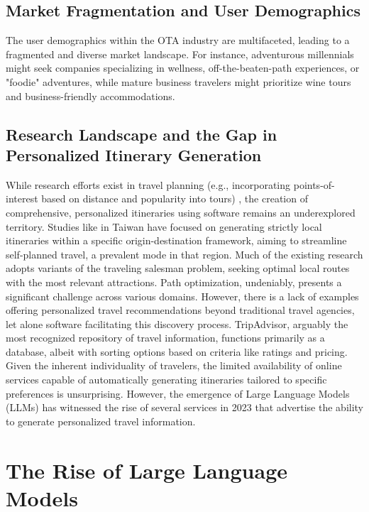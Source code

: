 \documentclass[12pt,a4paper]{report}
\begin{document}
\subsection{Market Fragmentation and User Demographics}

The user demographics within the OTA industry are multifaceted, leading to a fragmented and diverse market landscape. For instance, adventurous millennials might seek companies specializing in wellness, off-the-beaten-path experiences, or "foodie" adventures, while mature business travelers might prioritize wine tours and business-friendly accommodations.

\subsection{Research Landscape and the Gap in Personalized Itinerary Generation}

While research efforts exist in travel planning (e.g., incorporating points-of-interest based on distance and popularity into tours) \citep{taylortravelitin}, the creation of comprehensive, personalized itineraries using software remains an underexplored territory. Studies like \citet{changlocalitin} in Taiwan have focused on generating strictly local itineraries within a specific origin-destination framework, aiming to streamline self-planned travel, a prevalent mode in that region. Much of the existing research adopts variants of the traveling salesman problem, seeking optimal local routes with the most relevant attractions. Path optimization, undeniably, presents a significant challenge across various domains. However, there is a lack of examples offering personalized travel recommendations beyond traditional travel agencies, let alone software facilitating this discovery process. TripAdvisor, arguably the most recognized repository of travel information, functions primarily as a database, albeit with sorting options based on criteria like ratings and pricing. Given the inherent individuality of travelers, the limited availability of online services capable of automatically generating itineraries tailored to specific preferences is unsurprising. However, the emergence of Large Language Models (LLMs) has witnessed the rise of several services in 2023 that advertise the ability to generate personalized travel information.

\section{The Rise of Large Language Models}
\end{document}
